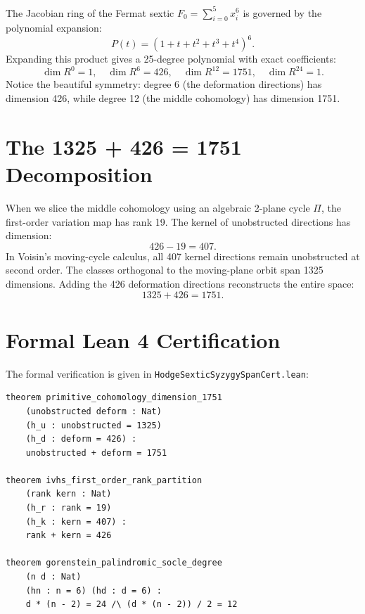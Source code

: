 \documentclass[11pt,a4paper]{article}
\theoremstyle{definition}
\begin{document}
The Jacobian ring of the Fermat sextic $F_0 = \sum_{i=0}^5 x_i^6$ is governed by the polynomial expansion:
\begin{equation}
P(t) = (1 + t + t^2 + t^3 + t^4)^6.
\end{equation}
Expanding this product gives a 25-degree polynomial with exact coefficients:
\begin{equation}
\dim R^0 = 1, \quad \dim R^6 = 426, \quad \dim R^{12} = 1751, \quad \dim R^{24} = 1.
\end{equation}
Notice the beautiful symmetry: degree 6 (the deformation directions) has dimension 426, while degree 12 (the middle cohomology) has dimension 1751.

\section{The 1325 + 426 = 1751 Decomposition}

When we slice the middle cohomology using an algebraic 2-plane cycle $\Pi$, the first-order variation map has rank 19. The kernel of unobstructed directions has dimension:
\begin{equation}
426 - 19 = 407.
\end{equation}
In Voisin's moving-cycle calculus, all 407 kernel directions remain unobstructed at second order. The classes orthogonal to the moving-plane orbit span 1325 dimensions. Adding the 426 deformation directions reconstructs the entire space:
\begin{equation}
1325 + 426 = 1751.
\end{equation}

\section{Formal Lean 4 Certification}

The formal verification is given in \texttt{HodgeSexticSyzygySpanCert.lean}:

\begin{lstlisting}[language=Lean4]
theorem primitive_cohomology_dimension_1751
    (unobstructed deform : Nat)
    (h_u : unobstructed = 1325)
    (h_d : deform = 426) :
    unobstructed + deform = 1751

theorem ivhs_first_order_rank_partition
    (rank kern : Nat)
    (h_r : rank = 19)
    (h_k : kern = 407) :
    rank + kern = 426

theorem gorenstein_palindromic_socle_degree
    (n d : Nat)
    (hn : n = 6) (hd : d = 6) :
    d * (n - 2) = 24 /\ (d * (n - 2)) / 2 = 12
\end{lstlisting}
\end{document}
